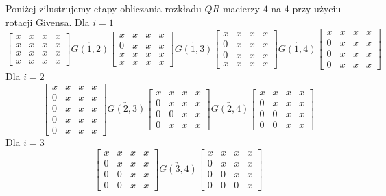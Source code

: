 \documentclass[12pt,a4paper]{report}
\newcommand{\mx}[1]{{#1}}
\begin{document}
\begin{example} Poniżej zilustrujemy etapy obliczania rozkładu $\mx{QR}$ macierzy $4$ na $4$ przy użyciu rotacji Givensa.
Dla $i=1$
$$
\begin{bmatrix}
x & x & x & x \\
x & x & x & x \\
x & x & x & x \\
x & x & x & x   
\end{bmatrix} \underrightarrow{\mx{G}(1,2)} \begin{bmatrix}
x & x & x & x \\
0 & x & x & x \\
x & x & x & x \\
x & x & x & x   
\end{bmatrix} \underrightarrow{\mx{G}(1,3)} \begin{bmatrix}
x & x & x & x \\
0 & x & x & x \\
0 & x & x & x \\
x & x & x & x   
\end{bmatrix} \underrightarrow{\mx{G}(1,4)} \begin{bmatrix}
x & x & x & x \\
0 & x & x & x \\
0 & x & x & x \\
0 & x & x & x   
\end{bmatrix}  
$$
Dla $i=2$
$$
\begin{bmatrix}
x & x & x & x \\
0 & x & x & x  \\
0 & x & x & x \\
0 & x & x & x  \\
0 & x & x & x 
\end{bmatrix}  \underrightarrow{\mx{G}(2,3)} \begin{bmatrix}
x & x & x & x \\
0 & x & x & x \\
0 & 0 & x & x \\
0 & x & x & x   
\end{bmatrix} \underrightarrow{\mx{G}(2,4)} \begin{bmatrix}
x & x & x & x \\
0 & x & x & x \\
0 & 0 & x & x \\
0 & 0 & x & x   
\end{bmatrix} 
$$   
Dla $i=3$
$$
\begin{bmatrix}
x & x & x & x \\
0 & x & x & x \\
0 & 0 & x & x \\
0 & 0 & x & x   
\end{bmatrix} \underrightarrow{\mx{G}(3,4)} \begin{bmatrix}
x & x & x & x \\
0 & x & x & x \\
0 & 0 & x & x \\
0 & 0 & 0 & x   
\end{bmatrix} 
$$
\end{example}
\end{document}
